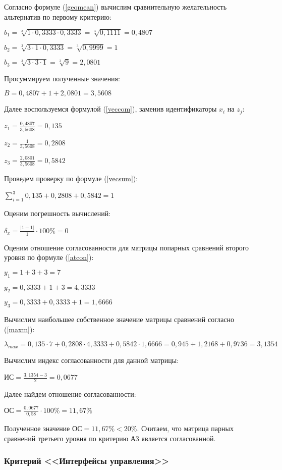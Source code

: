 Согласно формуле (\ref{geomean}) вычислим сравнительную желательность альтернатив по первому критерию:

$b_1 = \sqrt[3]{1 \cdot 0,3333 \cdot 0,3333} = \sqrt[3]{0,1111} = 0,4807$

$b_2 = \sqrt[3]{3 \cdot 1 \cdot 0,3333} = \sqrt[3]{0,9999} = 1$

$b_3 = \sqrt[3]{3 \cdot 3 \cdot 1} = \sqrt[3]{9} = 2,0801$

Просуммируем полученные значения:

$B = 0,4807 + 1 + 2,0801 = 3,5608$

Далее воспользуемся формулой (\ref{veccom}), заменив идентификаторы $x_i$ на $z_j$:

$z_1 = \frac{0,4807}{3,5608} = 0,135$

$z_2 = \frac{1}{3,5608} = 0,2808$

$z_3 = \frac{2,0801}{3,5608} = 0,5842$

Проведем проверку по формуле (\ref{vecsum}):

$\sum_{i=1}^{3} 0,135 + 0,2808 + 0,5842 = 1$

Оценим погрешность вычислений:

$\delta_{x} = \frac{|1 - 1|}{1} \cdot 100\% = 0$

Оценим отношение согласованности для матрицы попарных сравнений второго уровня по формуле (\ref{atcon}):

$y_1 = 1 + 3 + 3 = 7$

$y_2 = 0,3333 + 1 + 3 = 4,3333$

$y_3 = 0,3333 + 0,3333 + 1 = 1,6666$

Вычислим наибольшее собственное значение матрицы сравнений согласно (\ref{maxm}):

$\lambda_{max} = 0,135 \cdot 7 + 0,2808 \cdot 4,3333 + 0,5842 \cdot 1,6666 = 0,945 + 1,2168 + 0,9736 = 3,1354$

Вычислим индекс согласованности для данной матрицы:

$\text{ИС} = \frac{3,1354 - 3}{2} = 0,0677$

Далее найдем отношение согласованности:

$\text{ОС} = \frac{0,0677}{0,58} \cdot 100\% = 11,67\%$

Полученное значение $\text{ОС} = 11,67\% < 20\%$.
Считаем, что матрица парных сравнений третьего уровня по критерию А3 является согласованной.

\subsubsection{Критерий <<Интерфейсы управления>>}

